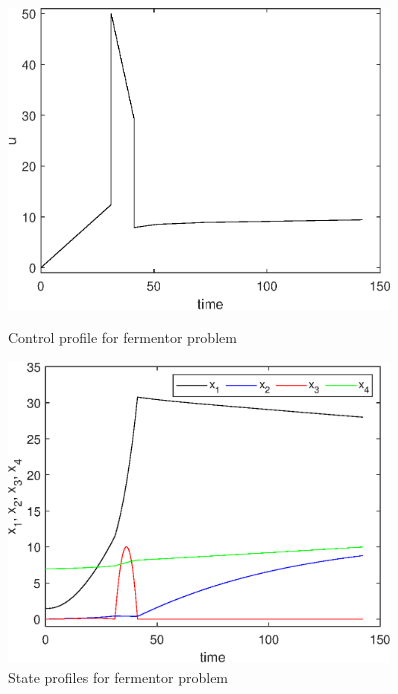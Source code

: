 \begin{figure}[htb]
	\begin{minipage}[t]{0.5\linewidth}
		\centering
		\includegraphics[width=0.9\textwidth]{examples/problem-fermentor/graphs/fermentor_control.eps}
		\caption[Problem 6: Control profile]{Control profile for fermentor problem}
		\label{fig:prob_fermentor_u} 
	\end{minipage}
	\begin{minipage}[t]{0.5\linewidth}
		\centering
		\includegraphics[width=0.9\textwidth]{examples/problem-fermentor/graphs/fermentor_states.eps}
		\caption[Problem 6: State profiles]{State profiles for fermentor problem}
		\label{fig:prob_fermentor_x}  
	\end{minipage}
\end{figure}

